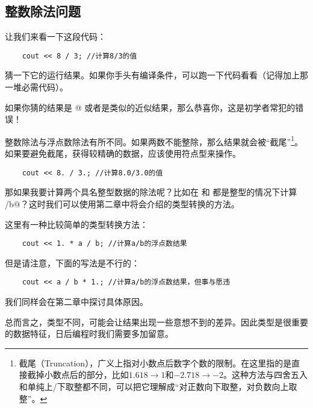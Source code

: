 \subsection*{整数除法问题}
让我们来看一下这段代码：
\begin{lstlisting}
    cout << 8 / 3; //计算8/3的值
\end{lstlisting}
猜一下它的运行结果。如果你手头有编译条件，可以跑一下代码看看（记得加上那一堆必需代码）。\par
如果你猜的结果是 @ 或者是类似的近似结果，那么恭喜你，这是初学者常犯的错误！\par
整数除法与浮点数除法有所不同。如果两数不能整除，那么结果就会被``截尾''\footnote{截尾（Truncation），广义上指对小数点后数字个数的限制。在这里指的是直接截掉小数点后的部分，比如$1.618\rightarrow1$和$-2.718\rightarrow-2$。这种方法与四舍五入和单纯上/下取整都不同，可以把它理解成``对正数向下取整，对负数向上取整''。}。如果要避免截尾，获得较精确的数据，应该使用符点型来操作。
\begin{lstlisting}
    cout << 8. / 3.; //计算8.0/3.0的值
\end{lstlisting}\par
那如果我要计算两个具名整型数据的除法呢？比如在 \lstinline@a@ 和 \lstinline@b@ 都是整型的情况下计算 \lstinline@a/b@？这时我们可以使用第二章中将会介绍的类型转换的方法。\par
这里有一种比较简单的类型转换方法：
\begin{lstlisting}
    cout << 1. * a / b; //计算a/b的浮点数结果
\end{lstlisting}
但是请注意，下面的写法是不行的：
\begin{lstlisting}
    cout << a / b * 1.; //计算a/b的浮点数结果，但事与愿违
\end{lstlisting}
我们同样会在第二章中探讨具体原因。\par
总而言之，类型不同，可能会让结果出现一些意想不到的差异。因此类型是很重要的数据特征，日后编程时我们需要多加留意。\par
